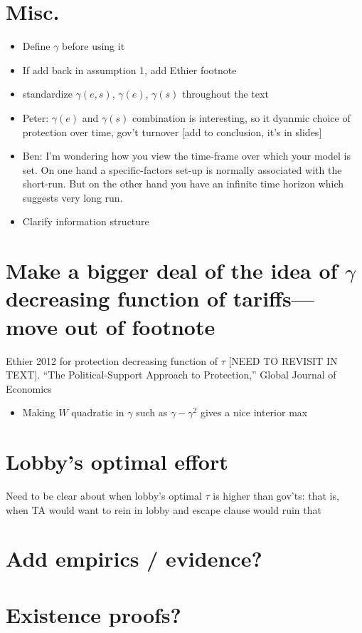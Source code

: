 \documentclass[12pt]{article}
\newcommand{\ga}{\gamma}
\begin{document}
\section{Misc.}
\begin{itemize}
	\item Define $\ga$ before using it
	\item If add back in assumption 1, add Ethier footnote
	\item standardize $\ga(e,s)$, $\ga(e)$, $\ga(s)$ throughout the text
	\item Peter: $\ga(e)$ and $\ga(s)$ combination is interesting, so it dyanmic choice of protection over time, gov't turnover [add to conclusion, it's in slides]
	\item Ben: I'm wondering how you view the time-frame over which your model is set.  On one hand a specific-factors set-up is normally associated with the short-run.  But on the other hand you have an infinite time horizon which suggests very long run.
	\item Clarify information structure
\end{itemize}


\section{Make a bigger deal of the idea of \texorpdfstring{$\gamma$}{gamma} decreasing function of tariffs---move out of footnote}
Ethier 2012 for protection decreasing function of $\tau$ [NEED TO REVISIT IN TEXT]. ``The Political-Support Approach to Protection,'' Global Journal of Economics
	\begin{itemize}
		\item Making $W$ quadratic in $\ga$ such as $\ga - \ga^2$ gives a nice interior max
	\end{itemize}


\section{Lobby's optimal effort}
Need to be clear about when lobby's optimal $\tau$ is higher than gov'ts: that is, when TA would want to rein in lobby and escape clause would ruin that


\section{Add empirics / evidence?}


\section{Existence proofs?}
\end{document}
